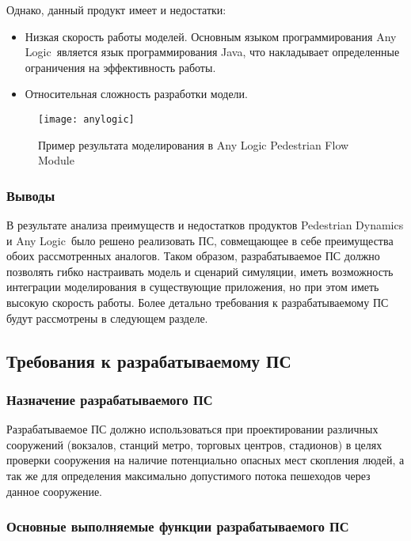 Однако, данный продукт имеет и недостатки:
\begin{itemize}
  \item Низкая скорость работы моделей. Основным языком программирования Any Logic\textregistered\ является язык программирования Java, что накладывает определенные ограничения на эффективность работы.
  \item Относительная сложность разработки модели.
\end{itemize}

\begin{figure}[ht!]
  \texttt{[image: anylogic]}
  \caption{Пример результата моделирования в Any Logic Pedestrian Flow Module}
  \label{sub:domain:analogs:anylogic:image_example}
\end{figure}

\subsubsection{Выводы}
\label{sub:domain:analogs:results}

В результате анализа преимуществ и недостатков продуктов Pedestrian Dynamics и Any Logic\textregistered\ было решено реализовать ПС, совмещающее в себе преимущества обоих рассмотренных аналогов.
Таком образом, разрабатываемое ПС должно позволять гибко настраивать модель и сценарий симуляции, иметь возможность интеграции моделирования в существующие приложения, но при этом иметь высокую скорость работы.
Более детально требования к разрабатываемому ПС будут рассмотрены в следующем разделе.

\subsection{Требования к разрабатываемому ПС}
\label{sub:domain:requirements}

\subsubsection{Назначение разрабатываемого ПС}
\label{sub:domain:requirements:purpose}

Разрабатываемое ПС должно использоваться при проектировании различных сооружений (вокзалов, станций метро, торговых центров, стадионов) в целях проверки сооружения на наличие потенциально опасных мест скопления людей, а так же для определения максимально допустимого потока пешеходов через данное сооружение.

\subsubsection{Основные выполняемые функции разрабатываемого ПС}
\label{sub:domain:requirements:functions}

